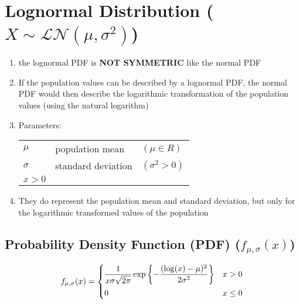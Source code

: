\chapter{Lognormal Distribution ($X \sim \mathcal{LN}(\mu, \sigma^2)$) \cite{ism-1}} \label{Lognormal Distribution}

\begin{enumerate}
    \item the lognormal PDF is \textbf{NOT SYMMETRIC} like the normal PDF 

    \item If the population values can be described by a lognormal PDF, the normal PDF would then describe the logarithmic transformation of the population values (using the natural logarithm)

    \item Parameters:
    \begin{table}[H]
        \centering
        \begin{tabular}{l l l}
            $\mu$ & population mean   & $(\mu \in R)$ \\
            
            $\sigma$ & standard deviation &   $(\sigma^2 > 0)$ \\
            
            $x > 0$ & & \\

        \end{tabular}
    \end{table}

    \item They do represent the population mean and standard deviation, but only for the logarithmic transformed values of the population

\end{enumerate}


\section{Probability Density Function (PDF) ($f_{\mu,\sigma}(x)$) \cite{ism-1}} \label{Lognormal Distribution: PDF}

\[
    f_{\mu,\sigma}(x)
    = \begin{cases}
        \dfrac{1}{x\sigma\sqrt{2\pi}}
        \exp\left\{-\dfrac{(\log(x) - \mu)^2}{2\sigma^2}\right\} & x > 0 \\[2ex]
        
        0 & x \leq 0
    \end{cases}
\]


